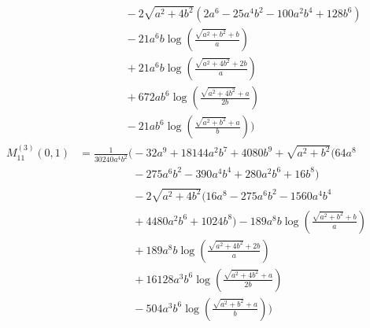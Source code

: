 \begin{align*}
&\phantom{{}=\frac{1}{840 a^{2} b^{2}}\Bigg(}- 2 \sqrt{a^{2} + 4 b^{2}}\left(2 a^{6} - 25 a^{4} b^{2} - 100 a^{2} b^{4} + 128 b^{6}\right)\\
&\phantom{{}=\frac{1}{840 a^{2} b^{2}}\Bigg(}- 21 a^{6} b \log\left(\frac{\sqrt{a^{2} + b^{2}} + b}{a}\right)\\
&\phantom{{}=\frac{1}{840 a^{2} b^{2}}\Bigg(}+ 21 a^{6} b \log\left(\frac{\sqrt{a^{2} + 4 b^{2}} + 2 b}{a}\right)\\
&\phantom{{}=\frac{1}{840 a^{2} b^{2}}\Bigg(}+ 672 a b^{6} \log\left(\frac{\sqrt{a^{2} + 4 b^{2}} + a}{2 b}\right)\\
&\phantom{{}=\frac{1}{840 a^{2} b^{2}}\Bigg(}- 21 a b^{6} \log\left(\frac{\sqrt{a^{2} + b^{2}} + a}{b}\right)\Bigg)\\[1.2ex]
M^{(3)}_{11}(0,1) &= \frac{1}{30240 a^{4} b^{2}}\Bigg(- 32 a^{9} + 18144 a^{2} b^{7} + 4080 b^{9} + \sqrt{a^{2} + b^{2}}\bigl(64 a^{8}\\
&\phantom{{}=\frac{1}{30240 a^{4} b^{2}}\Bigg(}- 275 a^{6} b^{2} - 390 a^{4} b^{4} + 280 a^{2} b^{6} + 16 b^{8}\bigr)\\
&\phantom{{}=\frac{1}{30240 a^{4} b^{2}}\Bigg(}- 2 \sqrt{a^{2} + 4 b^{2}}\bigl(16 a^{8} - 275 a^{6} b^{2} - 1560 a^{4} b^{4}\\
&\phantom{{}=\frac{1}{30240 a^{4} b^{2}}\Bigg(}+ 4480 a^{2} b^{6} + 1024 b^{8}\bigr) - 189 a^{8} b \log\left(\frac{\sqrt{a^{2} + b^{2}} + b}{a}\right)\\
&\phantom{{}=\frac{1}{30240 a^{4} b^{2}}\Bigg(}+ 189 a^{8} b \log\left(\frac{\sqrt{a^{2} + 4 b^{2}} + 2 b}{a}\right)\\
&\phantom{{}=\frac{1}{30240 a^{4} b^{2}}\Bigg(}+ 16128 a^{3} b^{6} \log\left(\frac{\sqrt{a^{2} + 4 b^{2}} + a}{2 b}\right)\\
&\phantom{{}=\frac{1}{30240 a^{4} b^{2}}\Bigg(}- 504 a^{3} b^{6} \log\left(\frac{\sqrt{a^{2} + b^{2}} + a}{b}\right)\Bigg)
\end{align*}

